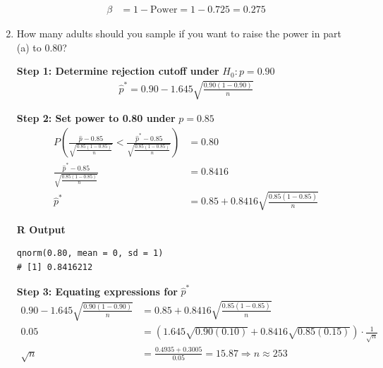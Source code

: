\begin{example}
\begin{enumerate}[label=\textbf{\alph*.}]
\begin{align*}
\beta &= 1 - \text{Power} = 1 - 0.725 = 0.275
\end{align*}

\item How many adults should you sample if you want to raise the power in part (a) to 0.80?

\textbf{Step 1: Determine rejection cutoff under } $H_0 : p = 0.90$
\begin{align*}
\hat{p}^* = 0.90 - 1.645 \sqrt{\frac{0.90(1 - 0.90)}{n}}
\end{align*}

\textbf{Step 2: Set power to 0.80 under } $p = 0.85$
\begin{align*}
P\left( \frac{\hat{p} - 0.85}{\sqrt{\frac{0.85(1 - 0.85)}{n}}} < \frac{\hat{p}^* - 0.85}{\sqrt{\frac{0.85(1 - 0.85)}{n}}} \right) &= 0.80 \\
\frac{\hat{p}^* - 0.85}{\sqrt{\frac{0.85(1 - 0.85)}{n}}} &= 0.8416 \\
\hat{p}^* &= 0.85 + 0.8416 \sqrt{\frac{0.85(1 - 0.85)}{n}}
\end{align*}

\noindent\textbf{R Output}
\begin{tcolorbox}[colback=gray!10, colframe=black!45, arc=2mm]
\begin{verbatim}
qnorm(0.80, mean = 0, sd = 1)
# [1] 0.8416212
\end{verbatim}
\end{tcolorbox}

\textbf{Step 3: Equating expressions for } $\hat{p}^*$
\begin{align*}
0.90 - 1.645 \sqrt{\frac{0.90(1 - 0.90)}{n}} &= 0.85 + 0.8416 \sqrt{\frac{0.85(1 - 0.85)}{n}} \\
0.05 &= \left(1.645 \sqrt{0.90(0.10)} + 0.8416 \sqrt{0.85(0.15)}\right) \cdot \frac{1}{\sqrt{n}} \\
\sqrt{n} &= \frac{0.4935 + 0.3005}{0.05} = 15.87 \Rightarrow n \approx 253
\end{align*}

\end{enumerate}
\end{example}
